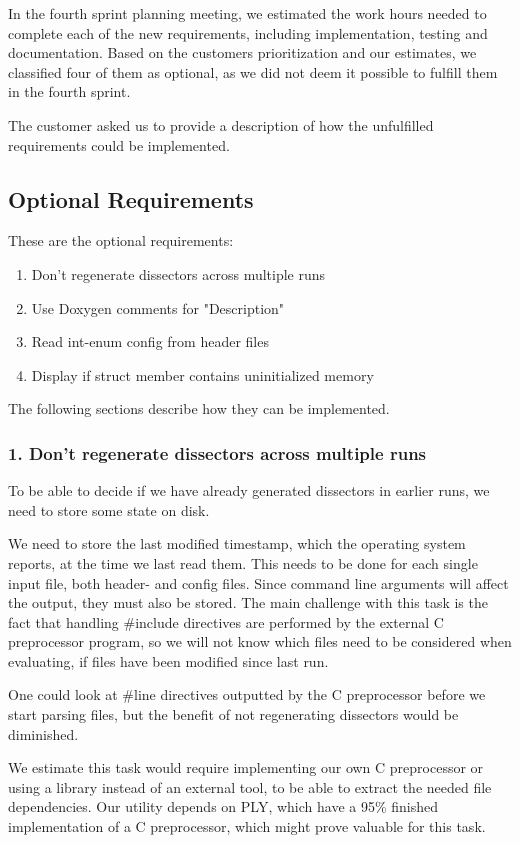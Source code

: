 In the fourth sprint planning meeting, we estimated the work hours needed to complete each of the new requirements, including implementation, testing and documentation. Based on the customers prioritization and our estimates, we classified four of them as optional, as we did not deem it possible to fulfill them in the fourth sprint. 

The customer asked us to provide a description of how the unfulfilled requirements could be implemented.

\subsection{Optional Requirements}
These are the optional requirements:
\begin{enumerate}
\item Don't regenerate dissectors across multiple runs
\item Use Doxygen comments for "Description"	
\item Read int-enum config from header files
\item Display if struct member contains uninitialized memory
\end {enumerate}
The following sections describe how they can be implemented.

\subsubsection{1. Don't regenerate dissectors across multiple runs}
To be able to decide if we have already generated dissectors in earlier runs, we need to store some state on disk. 

We need to store the last modified timestamp, which the operating system reports, at the time we last read them. 
This needs to be done for each single input file, both header- and config files.
Since command line arguments will affect the output, they must also be stored. The main challenge with this task is the fact that handling \#include directives are performed by the external C preprocessor program, so we will not know which files need to be considered when evaluating, if files have been modified since last run.

One could look at \#line directives outputted by the C preprocessor before we start parsing files, but the benefit of not regenerating dissectors would be diminished.

We estimate this task would require implementing our own C preprocessor or using a library instead of an external tool, to be able to extract the needed file dependencies. Our utility depends on PLY, which have a 95\% finished implementation of a C preprocessor, which might prove valuable for this task.

